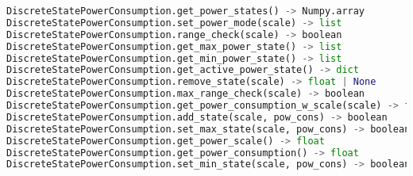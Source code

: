 \documentclass[]{scrartcl}
\begin{document}
\begin{lstlisting}[language=Python, frame=single, label={lst:cpu2memberFunctionsPowerDiscrete}, caption={The member functions for \textsf{DiscreteStatePowerConsumption} module.}]
DiscreteStatePowerConsumption.get_power_states() -> Numpy.array
DiscreteStatePowerConsumption.set_power_mode(scale) -> list
DiscreteStatePowerConsumption.range_check(scale) -> boolean
DiscreteStatePowerConsumption.get_max_power_state() -> list
DiscreteStatePowerConsumption.get_min_power_state() -> list
DiscreteStatePowerConsumption.get_active_power_state() -> dict
DiscreteStatePowerConsumption.remove_state(scale) -> float | None
DiscreteStatePowerConsumption.max_range_check(scale) -> boolean
DiscreteStatePowerConsumption.get_power_consumption_w_scale(scale) -> float
DiscreteStatePowerConsumption.add_state(scale, pow_cons) -> boolean
DiscreteStatePowerConsumption.set_max_state(scale, pow_cons) -> boolean
DiscreteStatePowerConsumption.get_power_scale() -> float
DiscreteStatePowerConsumption.get_power_consumption() -> float
DiscreteStatePowerConsumption.set_min_state(scale, pow_cons) -> boolean
\end{lstlisting}
        
            
\end{document}
